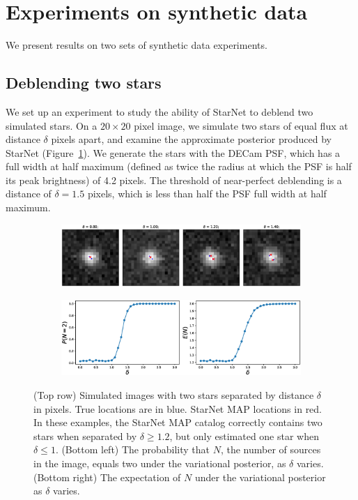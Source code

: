 \section{Experiments on synthetic data}

We present results on two sets of synthetic data experiments.

\subsection{Deblending two stars}

We set up an experiment to study the
ability of StarNet to deblend two simulated stars.
On a $20\times20$ pixel image,
we simulate two stars of equal flux at distance $\delta$ pixels apart, and
examine the approximate posterior produced by StarNet (Figure~\ref{fig:deblending_fig}).
We generate the stars with the DECam PSF, which 
has a full width at half maximum 
(defined as twice the radius at which the PSF is half its peak brightness) of 4.2 pixels. 
The threshold of near-perfect deblending is a distance of $\delta = 1.5$ pixels, which is less than half the PSF 
full width at half maximum. 

\begin{figure}[tb]
    \centering
    \begin{subfigure}{0.8\textwidth}
        \includegraphics[width=\textwidth]{figures_vg/deblending/example_deblending.eps}
    \end{subfigure}
    \begin{subfigure}{0.8\textwidth}
        \includegraphics[width=\textwidth]{figures_vg/deblending/summary_statistics.eps}
    \end{subfigure}
    \caption{(Top row) Simulated images with two stars separated by distance $\delta$ in pixels.
    True locations are in blue. StarNet MAP locations in red. 
    In these examples, the StarNet MAP catalog correctly contains two stars when separated by $\delta \geq 1.2$,
    but only estimated one star when $\delta \leq 1$.
    (Bottom left) The probability that $N$, the number of sources in the image, equals two
    under the variational posterior, as $\delta$ varies.
    (Bottom right) The expectation of $N$ under the variational posterior as $\delta$ varies. }
    \label{fig:deblending_fig}
\end{figure}

